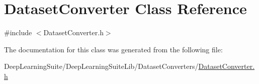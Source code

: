 \hypertarget{class_dataset_converter}{}\section{Dataset\+Converter Class Reference}
\label{class_dataset_converter}


{\ttfamily \#include $<$Dataset\+Converter.\+h$>$}



The documentation for this class was generated from the following file\+:\begin{DoxyCompactItemize}
\item 
Deep\+Learning\+Suite/\+Deep\+Learning\+Suite\+Lib/\+Dataset\+Converters/\hyperlink{_dataset_converter_8h}{Dataset\+Converter.\+h}\end{DoxyCompactItemize}
